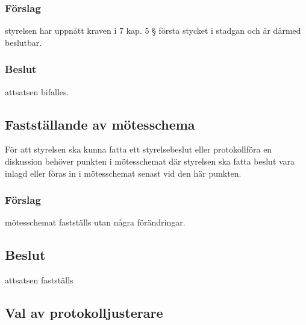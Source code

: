 \documentclass[protokoll]{dvd}
\begin{document}
        \subsubsection*{Förslag}

        \begin{attsatser}
            \item styrelsen har uppnått kraven i 7 kap. 5 § första stycket i stadgan och är därmed beslutbar.
        \end{attsatser}

        \subsubsection*{Beslut}

        \begin{attsatser}
            \item attsatsen bifalles.
        \end{attsatser}

    \subsection{Fastställande av mötesschema}

        För att styrelsen ska kunna fatta ett styrelsebeslut eller protokollföra en diskussion behöver punkten i mötesschemat där styrelsen ska fatta beslut vara inlagd eller föras in i mötesschemat senast vid den här punkten.

        \subsubsection*{Förslag}

        \begin{attsatser}
            \item mötesschemat fastställs utan några förändringar.
        \end{attsatser}

        \subsection*{Beslut}

        \begin{attsatser}
            \item attsatsen fastställs
        \end{attsatser}


    \subsection{Val av protokolljusterare}
\end{document}
